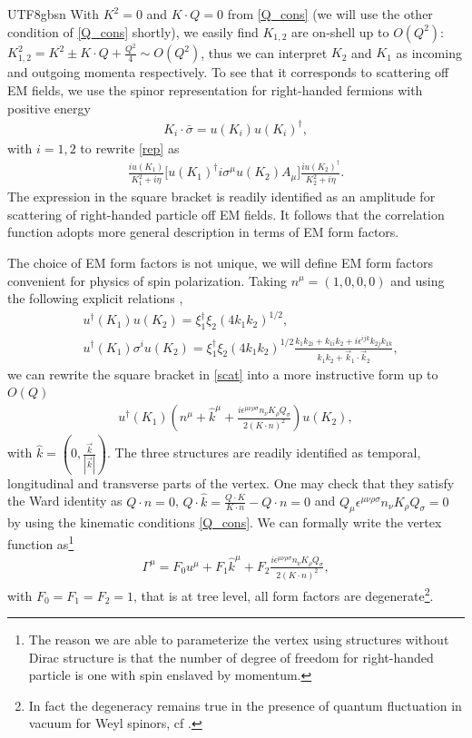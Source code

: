 \documentclass[11pt]{article}\def\baselinestretch{1.4}
\def\e{{\epsilon}}
\def\G{{\Gamma}}
\def\h{\eta}
\def\m{{\mu}}
\def\n{{\nu}}
\def\r{{\rho}}
\def\s{{\sigma}}
\def\x{{\xi}}
\def\({\left(}
\def\){\right)}
\newcommand{\dg}{\dagger}
\begin{document}
\begin{CJK}{UTF8}{gbsn}
With $K^2=0$ and $K\cdot Q=0$ from \eqref{Q_cons} (we will use the other condition of \eqref{Q_cons} shortly), we easily find $K_{1,2}$ are on-shell up to $O(Q^2)$: $K_{1,2}^2=K^2\pm K\cdot Q+\frac{Q^2}{4}\sim O(Q^2)$, thus we can interpret $K_2$ and $K_1$ as incoming and outgoing momenta respectively. To see that it corresponds to scattering off EM fields, we use the spinor representation for right-handed fermions with positive energy
\begin{align}
K_i\cdot\bar{\s}=u(K_i)u(K_i)^\dg,
\end{align}
with $i=1,2$ to rewrite \eqref{rep} as
\begin{align}\label{scat}
\frac{iu(K_1)}{K_1^2+i\h}\big[u(K_1)^\dg i\s^\m u(K_2)A_\m\big]\frac{iu(K_2)^\dg}{K_2^2+i\h}.
\end{align}
The expression in the square bracket is readily identified as an amplitude for scattering of right-handed particle off EM fields. It follows that the correlation function adopts more general description in terms of EM form factors.

The choice of EM form factors is not unique, we will define EM form factors convenient for physics of spin polarization. Taking $n^\m=(1,0,0,0)$ and using the following explicit relations \cite{Dong:2021fxn},
\begin{align}\label{spinor_products}
&u^\dg(K_1)u(K_2) = \x_1^\dg\x_2(4k_1k_2)^{1/2},\nonumber\\
&u^\dg(K_1)\s^i u(K_2) = \x_1^\dg\x_2(4k_1k_2)^{1/2}\frac{k_1k_{2i}+k_{1i}k_2+i\e^{ijk}k_{2j}k_{1k}}{k_1k_2+\vec{k}_1\cdot\vec{k}_2},
\end{align}
we can rewrite the square bracket in \eqref{scat} into a more instructive form up to $O(Q)$
\begin{align}
u^\dg(K_1) \(n^\m+\hat{k}^\m+\frac{i\e^{\m\n\r\s} n_\n K_\r Q_\s}{2(K\cdot n)^2}\) u(K_2),
\end{align}
with $\hat{k}=(0,\frac{\vec{k}}{|\vec{k}|})$. The three structures are readily identified as temporal, longitudinal and transverse parts of the vertex. One may check that they satisfy the Ward identity as $Q\cdot n=0$, $Q\cdot\hat{k}=\frac{Q\cdot K}{K\cdot n}-Q\cdot n=0$ and $Q_\m \e^{\m\n\r\s} n_\n K_\r Q_\s=0$ by using the kinematic conditions \eqref{Q_cons}. We can formally write the vertex function as\footnote{The reason we are able to parameterize the vertex using structures without Dirac structure is that the number of degree of freedom for right-handed particle is one with spin enslaved by momentum.}
\begin{align}%
\G^\m=F_0u^\m+F_1\hat{k}^\m+F_2\frac{i\e^{\m\n\r\s}n_\n K_\r Q_\s}{2(K\cdot n)^2},
\end{align}
with $F_0=F_1=F_2=1$, that is at tree level, all form factors are degenerate\footnote{In fact the degeneracy remains true in the presence of quantum fluctuation in vacuum for Weyl spinors, cf \cite{Giunti:2014ixa}.}.


\end{CJK}
\end{document}
